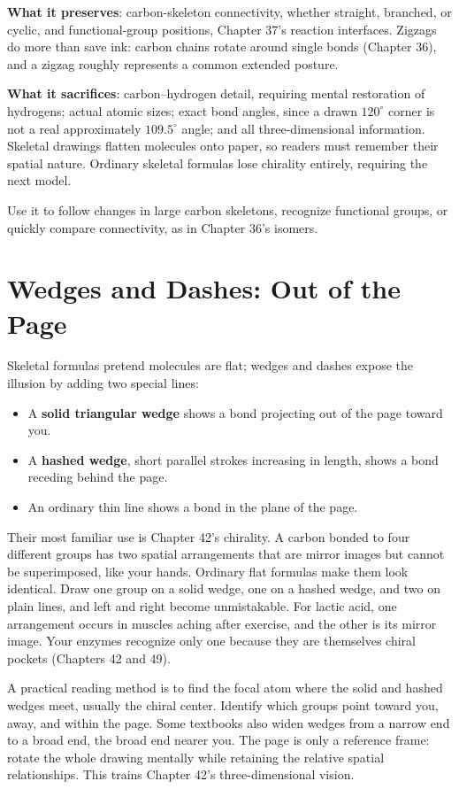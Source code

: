 \textbf{What it preserves}: carbon-skeleton connectivity, whether straight, branched, or cyclic, and functional-group positions, Chapter 37's reaction interfaces. Zigzags do more than save ink: carbon chains rotate around single bonds (Chapter 36), and a zigzag roughly represents a common extended posture.

\textbf{What it sacrifices}: carbon--hydrogen detail, requiring mental restoration of hydrogens; actual atomic sizes; exact bond angles, since a drawn $120^{\circ}$ corner is not a real approximately $109.5^{\circ}$ angle; and all three-dimensional information. Skeletal drawings flatten molecules onto paper, so readers must remember their spatial nature. Ordinary skeletal formulas lose chirality entirely, requiring the next model.

Use it to follow changes in large carbon skeletons, recognize functional groups, or quickly compare connectivity, as in Chapter 36's isomers.

\section{Wedges and Dashes: Out of the Page}

Skeletal formulas pretend molecules are flat; wedges and dashes expose the illusion by adding two special lines:

\begin{itemize}[itemsep=2pt]
\item A \textbf{solid triangular wedge} shows a bond projecting out of the page toward you.
\item A \textbf{hashed wedge}, short parallel strokes increasing in length, shows a bond receding behind the page.
\item An ordinary thin line shows a bond in the plane of the page.
\end{itemize}

Their most familiar use is Chapter 42's chirality. A carbon bonded to four different groups has two spatial arrangements that are mirror images but cannot be superimposed, like your hands. Ordinary flat formulas make them look identical. Draw one group on a solid wedge, one on a hashed wedge, and two on plain lines, and left and right become unmistakable. For lactic acid, one arrangement occurs in muscles aching after exercise, and the other is its mirror image. Your enzymes recognize only one because they are themselves chiral pockets (Chapters 42 and 49).

A practical reading method is to find the focal atom where the solid and hashed wedges meet, usually the chiral center. Identify which groups point toward you, away, and within the page. Some textbooks also widen wedges from a narrow end to a broad end, the broad end nearer you. The page is only a reference frame: rotate the whole drawing mentally while retaining the relative spatial relationships. This trains Chapter 42's three-dimensional vision.

